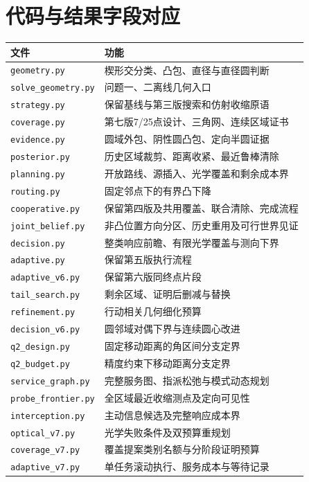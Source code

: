 \documentclass[UTF8,a4paper,zihao=-4,fontset=windows]{ctexart}
\begin{document}
\section{代码与结果字段对应}
\begin{longtable}{p{}p{}}\toprule
文件&功能\\\midrule
\texttt{geometry.py}&楔形交分类、凸包、直径与直径圆判断\\
\texttt{solve\_geometry.py}&问题一、二离线几何入口\\
\texttt{strategy.py}&保留基线与第三版搜索和仿射收缩原语\\
\texttt{coverage.py}&第七版7/25点设计、三角网、连续区域证书\\
\texttt{evidence.py}&圆域外包、阴性圆凸包、定向半圆证据\\
\texttt{posterior.py}&历史区域裁剪、距离收紧、最近鲁棒清除\\
\texttt{planning.py}&开放路线、源插入、光学覆盖和剩余成本界\\
\texttt{routing.py}&固定邻点下的有界凸下降\\
\texttt{cooperative.py}&保留第四版及共用覆盖、联合清除、完成流程\\
\texttt{joint\_belief.py}&非凸位置方向分区、历史重用及可行世界见证\\
\texttt{decision.py}&整类响应前瞻、有限光学覆盖与测向下界\\
\texttt{adaptive.py}&保留第五版执行流程\\
\texttt{adaptive\_v6.py}&保留第六版同终点片段\\
\texttt{tail\_search.py}&剩余区域、证明后删减与替换\\
\texttt{refinement.py}&行动相关几何细化预算\\
\texttt{decision\_v6.py}&圆邻域对偶下界与连续圆心改进\\
\texttt{q2\_design.py}&固定移动距离的角区间分支定界\\
\texttt{q2\_budget.py}&精度约束下移动距离分支定界\\
\texttt{service\_graph.py}&完整服务图、指派松弛与模式动态规划\\
\texttt{probe\_frontier.py}&全区域最近收缩测点及定向可见性\\
\texttt{interception.py}&主动信息候选及完整响应成本界\\
\texttt{optical\_v7.py}&光学失败条件及双预算重规划\\
\texttt{coverage\_v7.py}&覆盖提案类别名额与分阶段证明预算\\
\texttt{adaptive\_v7.py}&单任务滚动执行、服务成本与等待记录\\

\end{longtable}
\end{document}
